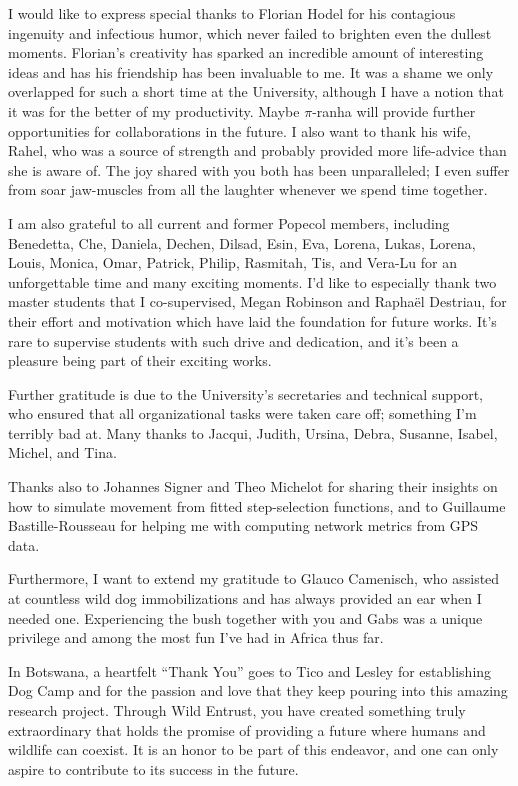\documentclass[../FinalThesis.tex]{subfiles}
\begin{document}
I would like to express special thanks to Florian Hodel for his contagious
ingenuity and infectious humor, which never failed to brighten even the dullest
moments. Florian's creativity has sparked an incredible amount of interesting
ideas and has his friendship has been invaluable to me. It was a shame we only
overlapped for such a short time at the University, although I have a notion
that it was for the better of my productivity. Maybe $\pi$-ranha will provide
further opportunities for collaborations in the future. I also want to thank his
wife, Rahel, who was a source of strength and probably provided more life-advice
than she is aware of. The joy shared with you both has been unparalleled; I even
suffer from soar jaw-muscles from all the laughter whenever we spend time
together.

I am also grateful to all current and former Popecol members, including
Benedetta, Che, Daniela, Dechen, Dilsad, Esin, Eva, Lorena, Lukas, Lorena,
Louis, Monica, Omar, Patrick, Philip, Rasmitah, Tis, and Vera-Lu for an
unforgettable time and many exciting moments. I'd like to especially thank two
master students that I co-supervised, Megan Robinson and Rapha{\"e}l Destriau,
for their effort and motivation which have laid the foundation for future works.
It's rare to supervise students with such drive and dedication, and it's been a
pleasure being part of their exciting works.

Further gratitude is due to the University's secretaries and technical support,
who ensured that all organizational tasks were taken care off; something I'm
terribly bad at. Many thanks to Jacqui, Judith, Ursina, Debra, Susanne, Isabel,
Michel, and Tina.

Thanks also to Johannes Signer and Theo Michelot for sharing their insights on
how to simulate movement from fitted step-selection functions, and to Guillaume
Bastille-Rousseau for helping me with computing network metrics from GPS data.

Furthermore, I want to extend my gratitude to Glauco Camenisch, who assisted at
countless wild dog immobilizations and has always provided an ear when I needed
one. Experiencing the bush together with you and Gabs was a unique privilege and
among the most fun I've had in Africa thus far.

In Botswana, a heartfelt ``Thank You'' goes to Tico and Lesley for establishing
Dog Camp and for the passion and love that they keep pouring into this amazing
research project. Through Wild Entrust, you have created something truly
extraordinary that holds the promise of providing a future where humans and
wildlife can coexist. It is an honor to be part of this endeavor, and one can
only aspire to contribute to its success in the future.
\end{document}
